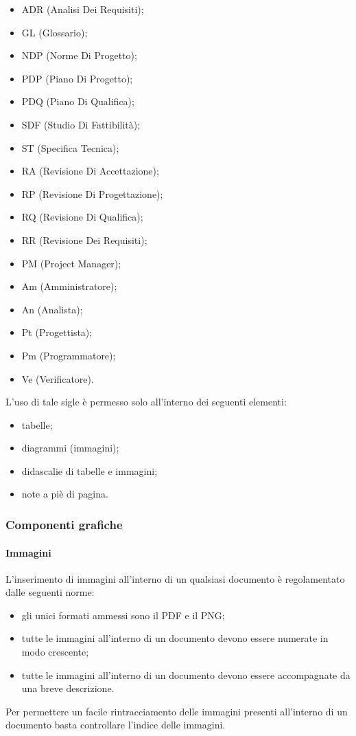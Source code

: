 					\begin{itemize}
						\item ADR (Analisi Dei Requisiti);
						\item GL (Glossario);
						\item NDP (Norme Di Progetto);
						\item PDP (Piano Di Progetto);
						\item PDQ (Piano Di Qualifica);
						\item SDF (Studio Di Fattibilità);
						\item ST (Specifica Tecnica);
						\item RA (Revisione Di Accettazione);
						\item RP (Revisione Di Progettazione);
						\item RQ (Revisione Di Qualifica);
						\item RR (Revisione Dei Requisiti);
						\item PM (Project Manager);
						\item Am (Amministratore);
						\item An (Analista);
						\item Pt (Progettista);
						\item Pm (Programmatore);
						\item Ve (Verificatore).
					\end{itemize}
					L’uso di tale sigle è permesso solo all’interno dei seguenti elementi:
					\begin{itemize}
						\item tabelle;
						\item diagrammi (immagini);
						\item didascalie di tabelle e immagini;
						\item note a piè di pagina.
					\end{itemize}
		\subsubsection{Componenti grafiche}
			\paragraph{Immagini}
				L’inserimento di immagini all’interno di un qualsiasi documento è regolamentato dalle seguenti norme:
				\begin{itemize}
					\item gli unici formati ammessi sono il PDF e il PNG;
					\item tutte le immagini all’interno di un documento devono essere numerate in modo crescente;
					\item tutte le immagini all’interno di un documento devono essere accompagnate da una breve descrizione.
				\end{itemize}
				Per permettere un facile rintracciamento delle immagini presenti all’interno di un documento basta controllare l’indice delle immagini.
